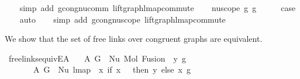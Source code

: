 \begin{isabellebody}
\ \ \isamarkupfalse%
\ {\isacharparenleft}{\kern0pt}simp\ add{\isacharcolon}{\kern0pt}\ gcong{\isachardot}{\kern0pt}nu{\isacharunderscore}{\kern0pt}comm\ lift{\isacharunderscore}{\kern0pt}graph{\isacharunderscore}{\kern0pt}lmap{\isacharunderscore}{\kern0pt}commute{\isacharparenright}{\kern0pt}\isanewline
{}\isamarkupfalse%
\isanewline
\ \ \isamarkupfalse%
\ {\isacharparenleft}{\kern0pt}nu{\isacharunderscore}{\kern0pt}scope\ g{}\ g{}{\isacharparenright}{\kern0pt}\isanewline
\ \ \isamarkupfalse%
\ \isamarkupfalse%
\ {\isacharquery}{\kern0pt}case\isanewline
\ \ \isamarkupfalse%
\ auto\isanewline
\ \ \isamarkupfalse%
\ {\isacharparenleft}{\kern0pt}simp\ add{\isacharcolon}{\kern0pt}\ gcong{\isachardot}{\kern0pt}nu{\isacharunderscore}{\kern0pt}scope\ lift{\isacharunderscore}{\kern0pt}graph{\isacharunderscore}{\kern0pt}lmap{\isacharunderscore}{\kern0pt}commute{\isacharparenright}{\kern0pt}\isanewline
{}\isamarkupfalse%
%
\endisatagproof
{\isafoldproof}%
%
\isadelimproof
%
\endisadelimproof
%
\isadelimdocument
%
\endisadelimdocument
%
\isatagdocument
%
\isamarkuptrue%
%
\isamarkuptrue%
%
\endisatagdocument
{\isafolddocument}%
%
\isadelimdocument
%
\endisadelimdocument
%
\begin{isamarkuptext}%
We show that the set of free links over congruent graphs are equivalent.%
\end{isamarkuptext}\isamarkuptrue%
\isamarkupfalse%
\ freelinks{\isacharunderscore}{\kern0pt}equiv{\isacharunderscore}{\kern0pt}E{}A{\isacharcolon}{\kern0pt}\isanewline
\ \ \ A{}{\isacharcolon}{\kern0pt}\ {\isachardoublequoteopen}G{}\ {\isacharequal}{\kern0pt}\ Nu\ {\isacharparenleft}{\kern0pt}Mol\ {\isacharparenleft}{\kern0pt}Fusion\ {}\ y{\isacharparenright}{\kern0pt}\ g{\isacharparenright}{\kern0pt}{\isachardoublequoteclose}\isanewline
\ \ \ \ \ \ \ A{}{\isacharcolon}{\kern0pt}\ {\isachardoublequoteopen}G{}\ {\isacharequal}{\kern0pt}\ Nu\ {\isacharparenleft}{\kern0pt}lmap\ {\isacharparenleft}{\kern0pt}{\isasymlambda}\ x{\isachardot}{\kern0pt}\ if\ x\ {\isacharequal}{\kern0pt}\ {}\ then\ y\ else\ x{\isacharparenright}{\kern0pt}\ g{\isacharparenright}{\kern0pt}{\isachardoublequoteclose}\isanewline

\end{isabellebody}

